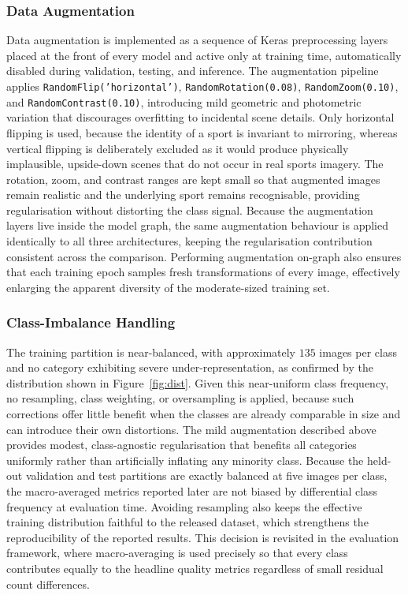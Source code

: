 \subsubsection{Data Augmentation}
\label{subsubsec:method-augmentation}

Data augmentation is implemented as a sequence of Keras preprocessing layers placed at the front of every model and active only at training time, automatically disabled during validation, testing, and inference.
The augmentation pipeline applies \texttt{RandomFlip('horizontal')}, \texttt{RandomRotation(0.08)}, \texttt{RandomZoom(0.10)}, and \texttt{RandomContrast(0.10)}, introducing mild geometric and photometric variation that discourages overfitting to incidental scene details.
Only horizontal flipping is used, because the identity of a sport is invariant to mirroring, whereas vertical flipping is deliberately excluded as it would produce physically implausible, upside-down scenes that do not occur in real sports imagery.
The rotation, zoom, and contrast ranges are kept small so that augmented images remain realistic and the underlying sport remains recognisable, providing regularisation without distorting the class signal.
Because the augmentation layers live inside the model graph, the same augmentation behaviour is applied identically to all three architectures, keeping the regularisation contribution consistent across the comparison.
Performing augmentation on-graph also ensures that each training epoch samples fresh transformations of every image, effectively enlarging the apparent diversity of the moderate-sized training set.

\subsubsection{Class-Imbalance Handling}
\label{subsubsec:method-imbalance}

The training partition is near-balanced, with approximately $135$ images per class and no category exhibiting severe under-representation, as confirmed by the distribution shown in Figure~\ref{fig:dist}.
Given this near-uniform class frequency, no resampling, class weighting, or oversampling is applied, because such corrections offer little benefit when the classes are already comparable in size and can introduce their own distortions.
The mild augmentation described above provides modest, class-agnostic regularisation that benefits all categories uniformly rather than artificially inflating any minority class.
Because the held-out validation and test partitions are exactly balanced at five images per class, the macro-averaged metrics reported later are not biased by differential class frequency at evaluation time.
Avoiding resampling also keeps the effective training distribution faithful to the released dataset, which strengthens the reproducibility of the reported results.
This decision is revisited in the evaluation framework, where macro-averaging is used precisely so that every class contributes equally to the headline quality metrics regardless of small residual count differences.

